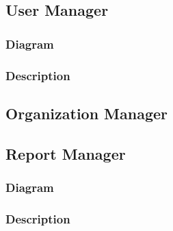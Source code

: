 \documentclass{article}
\begin{document}
\subsection{User Manager} %

\subsubsection{Diagram}

\subsubsection{Description}

\subsection{Organization Manager}

\subsection{Report Manager} %

\subsubsection{Diagram}

\subsubsection{Description}
\end{document}
